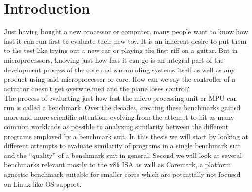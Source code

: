\documentclass[../bachelor_paper.tex]{subfiles}
\begin{document}
\chapter{Introduction}
    \label{ch:intro}

Just having bought a new processor or computer, many people want to know how fast it can run first to evaluate their new toy. It is an inherent desire to put them to the test like trying out a new car or playing the first riff on a guitar. But in microprocessors, knowing just how fast it can go is an integral part of the development process of the core and surrounding systems itself as well as any product using said microprocessor or core. How can we say the controller of a actuator doesn't get overwhelmed and the plane loses control?\\ 
The process of evaluating just how fast the micro processing unit or \acs{MPU} can run is called a benchmark. Over the decades, creating these benchmarks gained more and more scientific attention, evolving from the attempt to hit as many common workloads as possible to analyzing similarity between the different programs employed by a benchmark suit. In this thesis we will start by looking at different attempts to evaluate similarity of programs in a single benchmark suit and the ``quality'' of a benchmark suit in general. Second we will look at several benchmarks relevant mostly to the x86 \acs{ISA} as well as Coremark\cite{gal-onExploringCoremarkBenchmark2012}, a platform agnostic benchmark suitable for smaller cores which are potentially not focused on Linux-like \acs{OS} support.

\biblio
\abrimport
\end{document}
